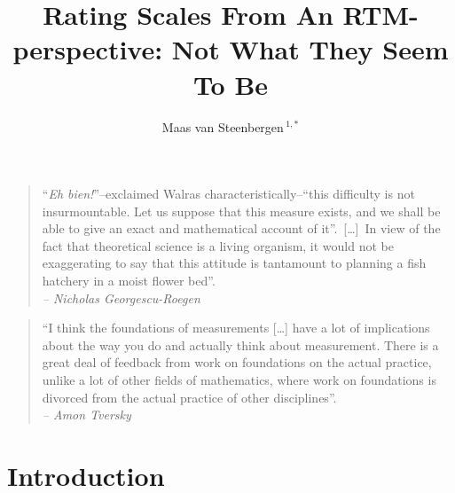 \documentclass[utf8]{FrontiersinVancouver}
\def\firstAuthorLast{van Steenbergen} %
\def\Authors{Maas van Steenbergen\,$^{1,*}$}
\begin{document}
\onecolumn
{}

\title[]{Rating Scales From An RTM-perspective: Not What They Seem To Be} 

\author[\firstAuthorLast]{\Authors} %
\address{} %
\correspondance{} %

\extraAuth{}%

\maketitle


\begin{quote}
    ``\textit{Eh bien!}''--exclaimed Walras characteristically--``this difficulty is not insurmountable. Let us suppose that this measure exists, and we shall be able to give an exact and mathematical account of it''.\ 
    [\dots]\ In view of the fact that theoretical science is a living organism, it would not be exaggerating to say that this attitude is tantamount to planning a fish hatchery in a moist flower bed''.\\
    \textit{-- Nicholas Georgescu-Roegen}

\end{quote}
\begin{quote}
    ``I think the foundations of measurements [\ldots] have a lot of implications about the way you do and actually think about measurement. There is a great deal of feedback from work on foundations on the actual practice, unlike a lot of other fields of mathematics, where work on foundations is divorced from the actual practice of other disciplines''.\\
    \textit{-- Amon Tversky}
\end{quote}

\section{Introduction}
\end{document}
